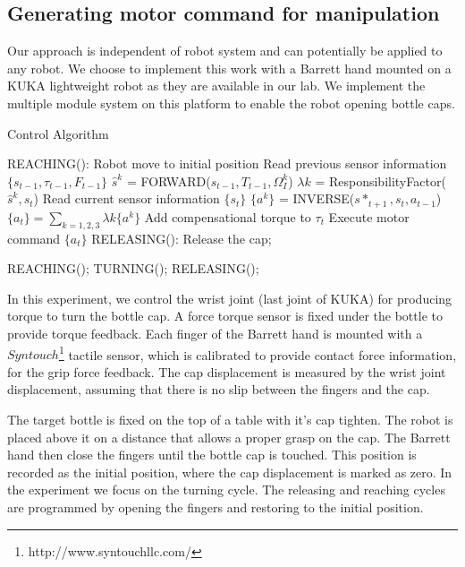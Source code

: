 \subsection{Generating motor command for manipulation}
\label{sec:command}
Our approach is independent of robot system and can potentially be applied to any robot. We choose to implement this work with a Barrett hand mounted on a KUKA lightweight robot as they are available in our lab. We implement the multiple module system on this platform to enable the robot opening bottle caps.

\begin{algorithm}
  \caption{Control Algorithm}
  \begin{algorithmic}[1]
    \State REACHING(): Robot move to initial position\;
          \State Read previous sensor information $\{s_{t-1},\tau_{t-1},F_{t-1}\}$\;
            \State $\hat{s}^{k}$ = FORWARD($s_{t-1},T_{t-1},\Omega_I^k$) \;
          \EndFor
            \State $\lambda{k}$ = ResponsibilityFactor($\hat{s}^{k},s_t$) \;
          \EndFor
          \State Read current sensor information $\{s_{t}\}$\;
            \State $\{a^k\}$ = INVERSE($s*_{t+1},s_t,a_{t-1}$) \;
          \EndFor
          \State $\{a_t\} = \sum_{k=1,2,3}\lambda{k}\{a^k\}$\;\;
          \State Add compensational torque to $\tau_t$\;
          \State Execute motor command $\{a_t\}$ \;
          \State RELEASING(): Release the cap;
        \EndFunction
    \EndFor

        \State REACHING();
        \State TURNING();
        \State RELEASING();
    \EndWhile

  \end{algorithmic}
  \label{code:control}
\end{algorithm}


In this experiment, we control the wrist joint (last joint of KUKA) for producing torque to turn the bottle cap. A force torque sensor is fixed under the bottle to provide torque feedback. Each finger of the Barrett hand is mounted with a $Syntouch$\footnote{http://www.syntouchllc.com/} tactile sensor, which is calibrated to provide contact force information, for the grip force feedback. The cap displacement is measured by the wrist joint displacement, assuming that there is no slip between the fingers and the cap.

The target bottle is fixed on the top of a table with it's cap tighten. The robot is placed above it on a distance that allows a proper grasp on the cap. The Barrett hand then close the fingers until the bottle cap is touched. This position is recorded as the initial position, where the cap displacement is marked as zero. In the experiment we focus on the turning cycle. The releasing and reaching cycles are programmed by opening the fingers and restoring to the initial position.

